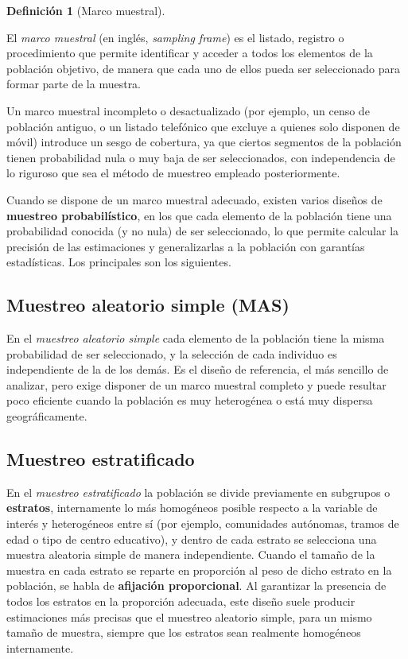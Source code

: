 \documentclass[
  spanish,
  a4paper,
]{scrreport}
\theoremstyle{definition}
\theoremstyle{definition}
\newtheorem{definition}{Definición}[chapter]
\theoremstyle{remark}
\begin{document}
\begin{definition}[Marco
muestral]\protect\hypertarget{def-encuestas-marco-muestral}{}\label{def-encuestas-marco-muestral}

El \emph{marco muestral} (en inglés, \emph{sampling frame}) es el
listado, registro o procedimiento que permite identificar y acceder a
todos los elementos de la población objetivo, de manera que cada uno de
ellos pueda ser seleccionado para formar parte de la muestra.

\end{definition}

Un marco muestral incompleto o desactualizado (por ejemplo, un censo de
población antiguo, o un listado telefónico que excluye a quienes solo
disponen de móvil) introduce un sesgo de cobertura, ya que ciertos
segmentos de la población tienen probabilidad nula o muy baja de ser
seleccionados, con independencia de lo riguroso que sea el método de
muestreo empleado posteriormente.

Cuando se dispone de un marco muestral adecuado, existen varios diseños
de \textbf{muestreo probabilístico}, en los que cada elemento de la
población tiene una probabilidad conocida (y no nula) de ser
seleccionado, lo que permite calcular la precisión de las estimaciones y
generalizarlas a la población con garantías estadísticas. Los
principales son los siguientes.

\subsection{Muestreo aleatorio simple
(MAS)}\label{muestreo-aleatorio-simple-mas}

En el \emph{muestreo aleatorio simple} cada elemento de la población
tiene la misma probabilidad de ser seleccionado, y la selección de cada
individuo es independiente de la de los demás. Es el diseño de
referencia, el más sencillo de analizar, pero exige disponer de un marco
muestral completo y puede resultar poco eficiente cuando la población es
muy heterogénea o está muy dispersa geográficamente.

\subsection{Muestreo estratificado}\label{muestreo-estratificado}

En el \emph{muestreo estratificado} la población se divide previamente
en subgrupos o \textbf{estratos}, internamente lo más homogéneos posible
respecto a la variable de interés y heterogéneos entre sí (por ejemplo,
comunidades autónomas, tramos de edad o tipo de centro educativo), y
dentro de cada estrato se selecciona una muestra aleatoria simple de
manera independiente. Cuando el tamaño de la muestra en cada estrato se
reparte en proporción al peso de dicho estrato en la población, se habla
de \textbf{afijación proporcional}. Al garantizar la presencia de todos
los estratos en la proporción adecuada, este diseño suele producir
estimaciones más precisas que el muestreo aleatorio simple, para un
mismo tamaño de muestra, siempre que los estratos sean realmente
homogéneos internamente.
\end{document}
